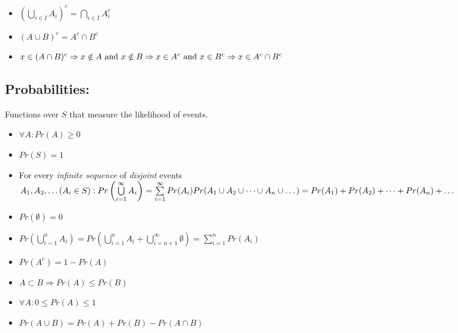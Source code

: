 \documentclass{article}[10pt]
\begin{document}
\begin{multicols}{2}
            \begin{itemize}
                \item[] \(\left (\bigcup\limits_{i\in I} A_i \right)^c = \bigcap\limits_{i\in I}A_i^c \)
                \item[] \((A\cup B)^c = A^c \cap B^c \)
                \item[] \(x\in(A\cap B)^c \\ 
                \Rightarrow x \notin A \text{ and } x\notin B \\
                \Rightarrow x \in A^c \text{ and } x \in B^c \\
                \Rightarrow x \in A^c \cap B^c \)
            \end{itemize}

    \subsection*{Probabilities: } 
        Functions over $S$ that measure the likelihood of events.

            \begin{itemize}
                \item[] $\forall A: Pr(A) \geq 0$
                \item[] $Pr(S) = 1$
                \item[] For every \textit{infinite sequence} of \textit{disjoint} events \( A_1, A_2, \dots (A_i \in S): \\
                Pr\left(\bigcup\limits_{i=1}^{\infty}A_i\right) = \sum\limits_{i=1}^{\infty} Pr(A_i) \\
                Pr(A_1 \cup A_2 \cup \dots \cup A_n \cup \dots) \\
                = Pr(A_1) + Pr(A_2) + \dots + Pr(A_n) + \dots \)
                \item[]\(Pr(\emptyset) = 0\)
                \item[]\(Pr(\bigcup\limits_{i=1}^{n}A_i)=Pr(\bigcup\limits_{i=1}^{n}A_i + \bigcup\limits_{i=n+1}^{\infty}\emptyset) = \sum\limits_{i=1}^{n}Pr(A_i)\)
                \item[]\(Pr(A^c) = 1-Pr(A)\)
                \item[]\(A \subset B \Rightarrow Pr(A) \leq Pr(B)\)
                \item[]\(\forall A: 0 \leq Pr(A) \leq 1\)
                \item[]\(Pr(A\cup B) = Pr(A) + Pr(B) - Pr(A\cap B)\)
            \end{itemize}


\end{multicols}
\end{document}
